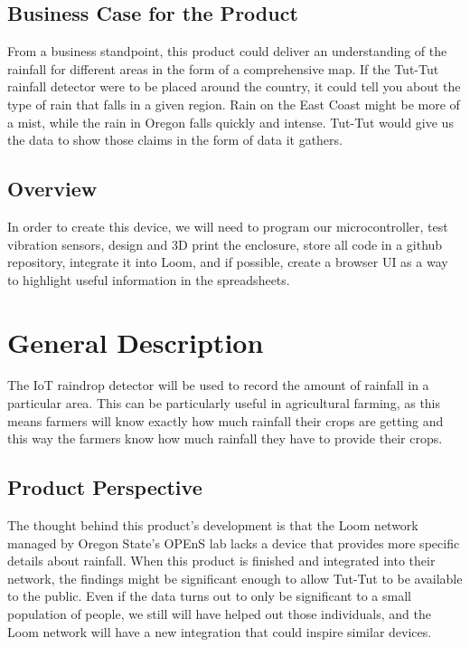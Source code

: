\documentclass[letterpaper,10pt,draftclsnofoot,onecolumn]{article}
\begin{document}
\subsection{Business Case for the Product}
From a business standpoint, this product could deliver an understanding of the rainfall for different areas in the form of a comprehensive map. If the Tut-Tut rainfall detector were to be placed around the country, it could tell you about the type of rain that falls in a given region. Rain on the East Coast might be more of a mist, while the rain in Oregon falls quickly and intense. Tut-Tut would give us the data to show those claims in the form of data it gathers.

\subsection{Overview}
In order to create this device, we will need to program our microcontroller, test vibration sensors, design and 3D print the enclosure, store all code in a github repository, integrate it into Loom, and if possible, create a browser UI as a way to highlight useful information in the spreadsheets.

\section{General Description}
The IoT raindrop detector will be used to record the amount of rainfall in a particular area. This can be particularly useful in agricultural farming, as this means farmers will know exactly how much rainfall their crops are getting and this way the farmers know how much rainfall they have to provide their crops. 

\subsection{Product Perspective}
The thought behind this product's development is that the Loom network managed by Oregon State's OPEnS lab lacks a device that provides more specific details about rainfall. When this product is finished and integrated into their network, the findings might be significant enough to allow Tut-Tut to be available to the public. Even if the data turns out to only be significant to a small population of people, we still will have helped out those individuals, and the Loom network will have a new integration that could inspire similar devices.
\end{document}
